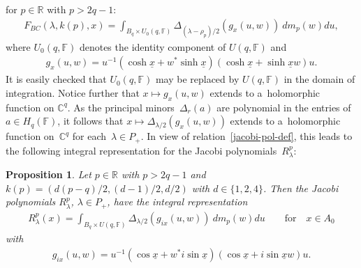 \documentclass[11pt]{article}
\numberwithin{equation}{section}
\newtheorem{Proposition}[Theorem]{Proposition}
{\theoremstyle{definition}
\newtheorem{Definition}[Theorem]{Definition}
\newtheorem{Note}[Theorem]{Note}
\newtheorem{Example}[Theorem]{Example}
\newtheorem{Remark}[Theorem]{Remark} }
\begin{document}
for $p\in \mathbb R$ with $p>2q-1$:
\begin{gather*}
F_{BC}(\lambda, k(p), x)=\int_{B_q\times U_0(q, \mathbb F)} \Delta_{(\lambda-\rho_p)/2}(g_x(u,w))\> dm_p(w)du,
\end{gather*}
where $U_0(q,\mathbb F)$ denotes the identity component of $U(q, \mathbb F)$ and
\begin{gather*}
g_x(u,w)=u^{-1}(\cosh \underline x+w^* \sinh \underline x)(\cosh \underline x+\sinh\underline x w)u.
\end{gather*}
It is easily checked that $U_0(q, \mathbb F)$ may be replaced by $U(q,\mathbb F)$ in the domain of integration.
Notice further that $x\mapsto g_x(u,w)$ extends to a~holomorphic function on $\mathbb C^q$.
As the principal minors~$\Delta_r(a)$ are polynomial in the entries of $a\in H_q(\mathbb F)$, it follows
that $x\mapsto\Delta_{\lambda/2}(g_x(u,w))$ extends to a~holomorphic function on~$\mathbb C^q$ for each~$\lambda \in P_+$.
In view of relation~\eqref{jacobi-pol-def}, this leads to the following integral representation for the Jacobi
polynomials~$R_\lambda^p$:

\begin{Proposition}
\label{int-rep-prop}
Let $p\in \mathbb R$ with $p>2q-1$ and $k(p)= (d(p-q)/2, (d-1)/2, d/2)$ with $d\in\{1,2,4\}$.
Then the Jacobi polynomials $ R_\lambda^p$, $\lambda \in P_+$, have the integral representation
\begin{gather}
\label{int-rep}
R_\lambda^p(x)= \int_{B_q\times U(q,\mathbb F)} \Delta_{\lambda/2}(g_{ix}(u,w))\> dm_p(w)du
\qquad
\text{for}
\quad
x\in A_0
\end{gather}
with
\begin{gather*}
g_{ix}(u,w)=u^{-1}(\cos\underline x+w^* i\sin \underline x)(\cos\underline x+i\sin \underline x w)u.
\end{gather*}
\end{Proposition}
\end{document}
